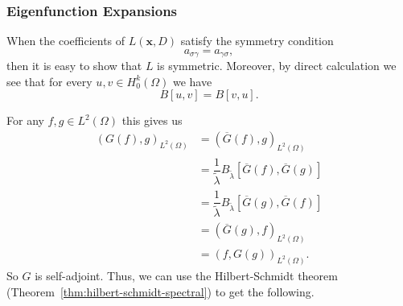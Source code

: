 \subsubsection{Eigenfunction Expansions}\label{subsec:symmetric-elliptic-eigenfunction-expansions}

When the coefficients of $L(\bm{x},D)$ satisfy the symmetry condition
\begin{equation}\label{eq:symmetric-elliptic-coefficient-condition}
a_{\sigma\gamma}=a_{\gamma\sigma},
\end{equation}
then it is easy to show that $L$ is symmetric. Moreover, by direct calculation we see that for every $u,v\in H_0^k(\Omega)$ we have
\begin{equation}\label{eq:symmetric-elliptic-bilinear-form-condition}
B[u,v]=B[v,u].
\end{equation}


For any $f,g\in L^2(\Omega)$ this gives us\[\begin{aligned}
(G(f),g)_{L^2(\Omega)}&=(\overline G(f),g)_{L^2(\Omega)}\\
&=\dfrac{1}{\widetilde\lambda}B_{\widetilde\lambda}[\overline G(f),\overline G(g)]\\
&=\dfrac{1}{\widetilde\lambda}B_{\widetilde\lambda}[\overline G(g),\overline G(f)]\\
&=(\overline G(g),f)_{L^2(\Omega)}\\
&=(f,G(g))_{L^2(\Omega)}.
\end{aligned}\]So $G$ is self-adjoint. Thus, we can use the Hilbert-Schmidt theorem (Theorem~\ref{thm:hilbert-schmidt-spectral}) to get the following.

